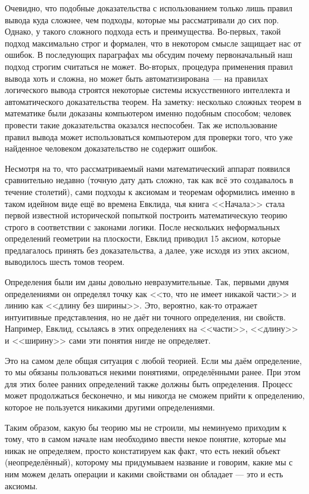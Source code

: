 Очевидно, что подобные доказательства с использованием только лишь правил вывода куда сложнее, чем подходы, которые мы рассматривали до сих пор. Однако, у такого сложного подхода есть и преимущества. Во-первых, такой подход максимально строг и формален, что в некотором смысле защищает нас от ошибок. В последующих параграфах мы обсудим почему первоначальный наш подход строгим считаться не может. Во-вторых, процедура применения правил вывода хоть и сложна, но может быть автоматизирована~--- на правилах логического вывода строятся некоторые системы искусственного интеллекта и автоматического доказательства теорем. На заметку: несколько сложных теорем в математике были доказаны компьютером именно подобным способом; человек провести такие доказательства оказался неспособен. Так же использование правил вывода может использоваться компьютером для проверки того, что уже найденное человеком доказательство не содержит ошибок.

Несмотря на то, что рассматриваемый нами математический аппарат появился сравнительно недавно (точную дату дать сложно, так как всё это создавалось в течение столетий), сами подходы к аксиомам и теоремам оформились именно в таком идейном виде ещё во времена Евклида, чья книга <<Начала>> стала первой известной исторической попыткой построить математическую теорию строго в соответствии с законами логики. После нескольких неформальных определений геометрии на плоскости, Евклид приводил 15 аксиом, которые предлагалось принять без доказательства, а далее, уже исходя из этих аксиом, выводилось шесть томов теорем.

Определения были им даны довольно невразумительные. Так, первыми двумя определениями он определял точку как <<то, что не имеет никакой части>> и линию как <<длину без ширины>>. Это, вероятно, как-то отражает интуитивные представления, но не даёт ни точного определения, ни свойств. Например, Евклид, ссылаясь в этих определениях на <<части>>, <<длину>> и <<ширину>> сами эти понятия нигде не определяет.

Это на самом деле общая ситуация с любой теорией. Если мы даём определение, то мы обязаны пользоваться некими понятиями, определёнными ранее. При этом для этих более ранних определений также должны быть определения. Процесс может продолжаться бесконечно, и мы никогда не сможем прийти к определению, которое не пользуется никакими другими определениями.

Таким образом, какую бы теорию мы не строили, мы неминуемо приходим к тому, что в самом начале нам необходимо ввести некое понятие, которые мы никак не определяем, просто констатируем как факт, что есть некий объект (неопределённый), которому мы придумываем название и говорим, какие мы с ним можем делать операции и какими свойствами он обладает --- это и есть аксиомы.

